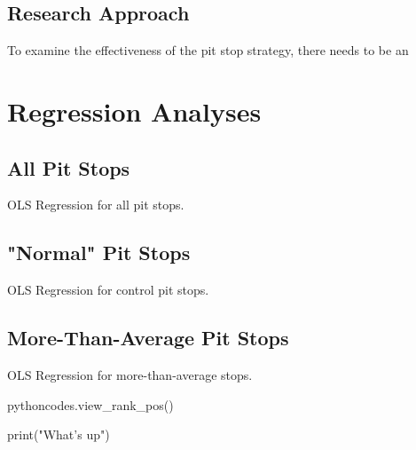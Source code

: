 \subsection{Research Approach}

To examine the effectiveness of the pit stop strategy, there needs to be an 

\section{Regression Analyses}

\subsection{All Pit Stops}

\begin{table}[ht]

\caption{OLS Regression for all pit stops.}
\label{tab:all_pits_reg}
\end{table}

\subsection{"Normal" Pit Stops}

\begin{table}[ht]

\caption{OLS Regression for control pit stops.}
\label{tab:control_pits_reg}
\end{table}

\subsection{More-Than-Average Pit Stops}

\begin{table}[ht]

\caption{OLS Regression for more-than-average stops.}
\label{tab:extra_pits_reg}
\end{table}

\begin{pycode}
pythoncodes.view_rank_pos()
\end{pycode}

\begin{pycode}
print("What's up")
\end{pycode}



